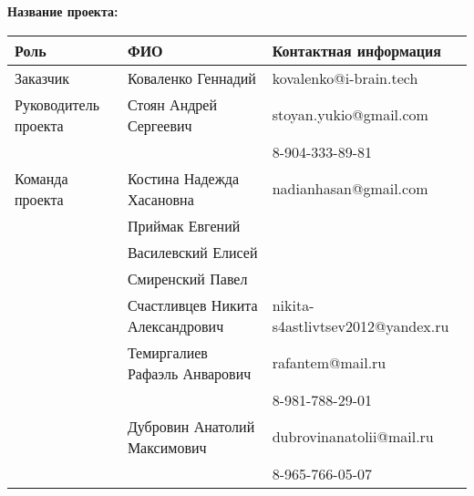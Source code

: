 \documentclass[a4paper,12pt]{article}
\begin{document}
\textbf{Название проекта: }

\vspace{5ex}


\begin{tabular}{|l|l|l|}
    \hline
    \textbf{Роль} & \textbf{ФИО} & \textbf{Контактная информация} \\
    \hline 
    Заказчик & Коваленко Геннадий & kovalenko@i-brain.tech \\
    \hline
    Руководитель проекта & Стоян Андрей Сергеевич 
       & stoyan.yukio@gmail.com \\ 
     & & 8-904-333-89-81 \\ 
    \hline
    Команда проекта 
     & Костина Надежда Хасановна 
       & nadianhasan@gmail.com \\ \cline{2-3}
     & Приймак Евгений & \\ \cline{2-3}
     & Василевский Елисей & \\ \cline{2-3}
     & Смиренский Павел & \\ \cline{2-3}
     & Счастливцев Никита Александрович 
       & nikita-s4astlivtsev2012@yandex.ru \\ \cline{2-3}
     & Темиргалиев Рафаэль Анварович
       & rafantem@mail.ru \\
     & & 8-981-788-29-01 \\ \cline{2-3}
     & Дубровин Анатолий Максимович
       & dubrovinanatolii@mail.ru \\ 
     & & 8-965-766-05-07 \\
    \hline
\end{tabular}
\end{document}
